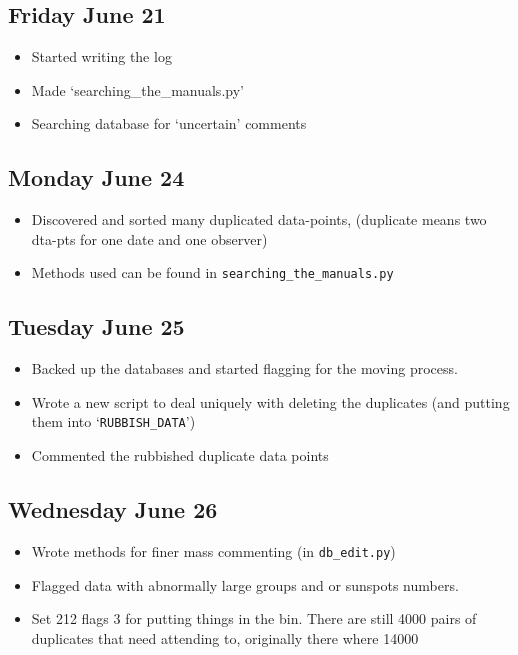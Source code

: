 \documentclass[12pt]{article}
\begin{document}
\subsection{Friday June 21}
\begin{itemize}
    \item Started writing the log
    \item Made `searching\_the\_manuals.py'
    \item Searching database for `uncertain' comments
\end{itemize}
    
\subsection{Monday June 24}
\begin{itemize}
    \item Discovered and sorted many duplicated data-points, (duplicate means two dta-pts for one date and one observer)
    \item Methods used can be found in \texttt{searching\_the\_manuals.py}
\end{itemize}
    
\subsection{Tuesday June 25}
\begin{itemize}
    \item Backed up the databases and started flagging for the moving process.
    \item Wrote a new script to deal uniquely with deleting the duplicates (and putting them into `\texttt{RUBBISH\_DATA}')
    \item Commented the rubbished duplicate data points
\end{itemize}
    
\subsection{Wednesday June 26}
\begin{itemize}
    \item Wrote methods for finer mass commenting (in \texttt{db\_edit.py})
    \item Flagged data with abnormally large groups and or sunspots numbers.
    \item Set 212 flags 3 for putting things in the bin. There are still 4000 pairs of duplicates that need attending to, originally there where 14000
\end{itemize}
    
\end{document}

